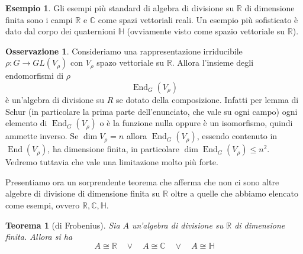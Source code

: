 \documentclass[11pt]{article}
\theoremstyle{plain}
\newtheorem{thm}{Teorema}[section]
\theoremstyle{definition}
\newtheorem{exmp}{Esempio}[section]
\newtheorem*{rem}{Osservazione}
\theoremstyle{remark}
\newcommand{\C}{\mathbb{C}}
\newcommand{\R}{\mathbb{R}}
\newcommand{\HH}{\mathbb{H}}
\DeclareMathOperator{\End}{End}
\begin{document}
\begin{exmp}
Gli esempi più standard di algebra di divisione su $\R$ di dimensione finita sono i campi $\R$ e $\C$ come spazi vettoriali reali.
Un esempio più sofisticato è dato dal corpo dei quaternioni $\HH$ (ovviamente visto come spazio vettoriale su $\R$).
\end{exmp}


\begin{rem}
Consideriamo una rappresentazione irriducibile $\rho:G\to GL(V_\rho)$ con $V_\rho$ spazo vettoriale su $\R$. Allora l'insieme degli endomorfismi
di $\rho$
\[ \End_G(V_\rho)\]
è un'algebra di divisione su $R$ se dotato della composizione.
Infatti per lemma di Schur (in particolare la prima parte dell'enunciato, che vale su ogni campo) ogni elemento di $\End_G(V_\rho)$ o è la funzione nulla oppure è un isomorfismo, quindi ammette inverso.
Se $\dim V_\rho = n$ allora $\End_G(V_\rho)$, essendo contenuto in $\End(V_\rho)$, ha dimensione finita, in particolare $\dim \End_G(V_\rho)\le n^2$.
Vedremo tuttavia che vale una limitazione molto più forte.
\end{rem}


Presentiamo ora un sorprendente teorema che afferma che non ci sono altre algebre di divisione di dimensione finita su $\R$ oltre a quelle che abbiamo elencato come esempi, ovvero $\R, \C, \HH$.
\begin{thm}[di Frobenius]
\label{thm: frobenius}
Sia $A$ un'algebra di divisione su $\R$ di dimensione finita. Allora si ha
\[A \cong \R \quad \vee \quad  A \cong \C \quad \vee \quad A  \cong \HH \]
\end{thm}
\end{document}
